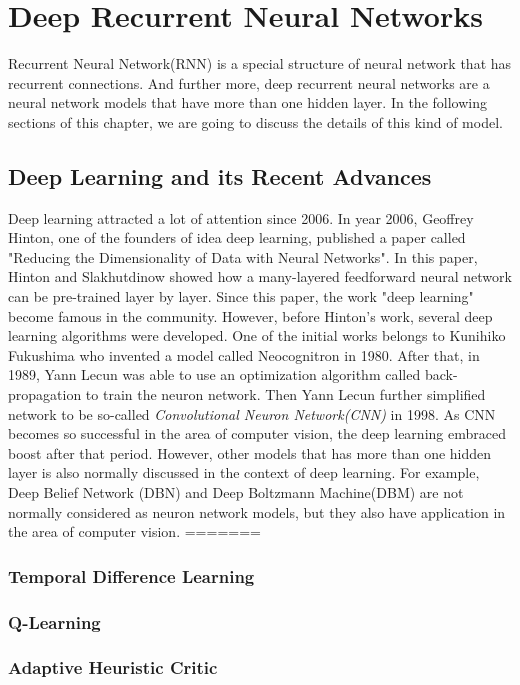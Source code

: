 \documentclass[officiallayout]{tktla}
\begin{document}
\chapter{Deep Recurrent Neural Networks}
Recurrent Neural Network(RNN) is a special structure of neural network that has recurrent connections. And further more, deep recurrent neural networks are a neural network models that have more than one hidden layer.  In the following sections of this chapter, we are going to discuss the details of this kind of model. 
\section{Deep Learning and its Recent Advances}
Deep learning attracted a lot of attention since 2006. In year 2006, Geoffrey Hinton, one of the founders of idea deep learning, published a paper called "Reducing the Dimensionality of
Data with Neural Networks"\cite{hinton2006reducing}. In this paper, Hinton and Slakhutdinow showed how a many-layered feedforward neural network can be pre-trained layer by layer. Since this paper, the work "deep learning" become famous in the community. However, before Hinton's work, several deep learning algorithms were developed. One of the initial works belongs to Kunihiko Fukushima who invented a model called Neocognitron in 1980. After that, in 1989, Yann Lecun was able to use an optimization algorithm called back-propagation to train the neuron network. Then Yann Lecun further simplified network to be so-called \textit{Convolutional Neuron Network(CNN)} in 1998. As CNN becomes so successful in the area of computer vision, the deep learning embraced boost after that period. However, other models that has more than one hidden layer is also normally discussed in the context of deep learning. For example, Deep Belief Network (DBN) and Deep Boltzmann Machine(DBM) are not normally considered as neuron network models, but they also have application in the area of computer vision.
=======
\subsection{Temporal Difference Learning}
\subsection{Q-Learning}
\subsection{Adaptive Heuristic Critic}
\end{document}
